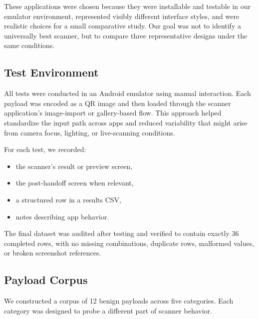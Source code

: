 \documentclass[11pt]{article}
\begin{document}
These applications were chosen because they were installable and testable in our emulator environment, represented visibly different interface styles, and were realistic choices for a small comparative study. Our goal was not to identify a universally best scanner, but to compare three representative designs under the same conditions.

\subsection{Test Environment}

All tests were conducted in an Android emulator using manual interaction. Each payload was encoded as a QR image and then loaded through the scanner application's image-import or gallery-based flow. This approach helped standardize the input path across apps and reduced variability that might arise from camera focus, lighting, or live-scanning conditions.

For each test, we recorded:
\begin{itemize}[leftmargin=1.5em]
    \item the scanner's result or preview screen,
    \item the post-handoff screen when relevant,
    \item a structured row in a results CSV,
    \item notes describing app behavior.
\end{itemize}

The final dataset was audited after testing and verified to contain exactly 36 completed rows, with no missing combinations, duplicate rows, malformed values, or broken screenshot references.

\subsection{Payload Corpus}

We constructed a corpus of 12 benign payloads across five categories. Each category was designed to probe a different part of scanner behavior.
\end{document}
